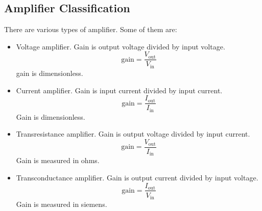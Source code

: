 \documentclass{article}
\begin{document}
    \subsection{Amplifier Classification}
    There are various types of amplifier.
    Some of them are:
    \begin{itemize}
        \item Voltage amplifier. Gain is output voltage divided by input voltage.
        \[\text{gain} = \frac{V_\text{out}}{V_\text{in}}\]
        gain is dimensionless.
        \item Current amplifier. Gain is input current divided by input current.
        \[\text{gain} = \frac{I_\text{out}}{I_\text{in}}\]
        Gain is dimensionless.
        \item Transresistance amplifier. Gain is output voltage divided by input current.
        \[\text{gain} = \frac{V_\text{out}}{I_\text{in}}\]
        Gain is measured in ohms.
        \item Transconductance amplifier. Gain is output current divided by input voltage.
        \[\text{gain} = \frac{I_\text{out}}{V_\text{in}}\]
        Gain is measured in siemens.
    \end{itemize}
\end{document}
